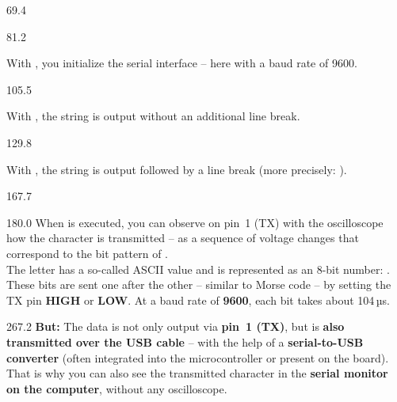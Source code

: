 \documentclass{aslab}
\begin{document}
\nextpage
\begin{region}{69.4}
\end{region}

\begin{region}[pitch=12.6]{81.2}
\begin{dashlist}
\item With , you initialize the serial interface --
  here with a baud rate of 9600.
\end{dashlist}
\end{region}

\begin{region}[pitch=12.6]{105.5}
\begin{dashlist}
\item With , the string  is output
  without an additional line break.
\end{dashlist}
\end{region}

\begin{region}[pitch=12.9]{129.8}
\begin{dashlist}
\item With , the string  is output
  followed by a line break (more precisely: \code{\r\n}).
\end{dashlist}
\end{region}

\begin{region}{167.7}
\end{region}

\begin{region}[pitch=12.38]{180.0}
When  is executed, you can observe on pin~1 (TX)
with the oscilloscope how the character  is transmitted -- as a
sequence of voltage changes that correspond to the bit pattern of
.\\
The letter  has a so-called ASCII value and is represented as an
8-bit number: . These bits are sent one after the other --
similar to Morse code -- by setting the TX pin \textbf{HIGH} or
\textbf{LOW}. At a baud rate of \textbf{9600}, each bit takes about
104\,µs.
\end{region}

\begin{region}[pitch=13]{267.2}
\textbf{But:} The data is not only output via \textbf{pin~1 (TX)}, but is
\textbf{also transmitted over the USB cable} -- with the help of a
\textbf{serial-to-USB converter} (often integrated into the microcontroller
or present on the board). That is why you can also see the transmitted
character in the \textbf{serial monitor on the computer}, without any
oscilloscope.
\end{region}
\end{document}
